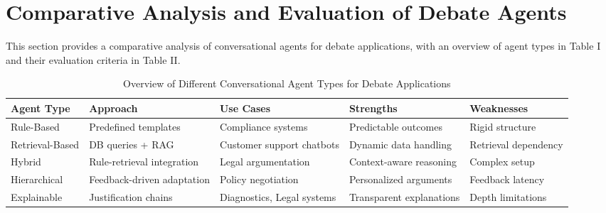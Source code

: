 \documentclass[conference]{IEEEtran}
\begin{document}
\section{Comparative Analysis and Evaluation of Debate Agents}
This section provides a comparative analysis of conversational agents for debate applications, with an overview of agent types in Table I and their evaluation criteria in Table II.
\begin{table}[h]
    \centering
    \caption{Overview of Different Conversational Agent Types for Debate Applications}
    \label{tab:agents}
    \begin{tabular}{|>{\centering\arraybackslash}p{1.2cm}|>{\centering\arraybackslash}p{1.5cm}|>{\centering\arraybackslash}p{1.6cm}|>{\centering\arraybackslash}p{1.3cm}|>{\centering\arraybackslash}p{1.3cm}|}
    \hline
    \textbf{Agent Type}   & \textbf{Approach}                    & \textbf{Use Cases}                   & \textbf{Strengths}         & \textbf{Weaknesses}        \\ \hline
    Rule-Based           & Predefined templates                  & Compliance systems \cite{b12}        & Predictable outcomes       & Rigid structure            \\ \hline
    Retrieval-Based      & DB queries + RAG                      & Customer support chatbots \cite{b1}  & Dynamic data handling      & Retrieval dependency       \\ \hline
    Hybrid               & Rule-retrieval integration            & Legal argumentation \cite{b3}        & Context-aware reasoning    & Complex setup              \\ \hline
    Hierarchical         & Feedback-driven adaptation \cite{b5}  & Policy negotiation                   & Personalized arguments     & Feedback latency           \\ \hline
    Explainable          & Justification chains \cite{b13}       & Diagnostics, Legal systems           & Transparent explanations   & Depth limitations          \\ \hline
    \end{tabular}
\end{table}
\end{document}
